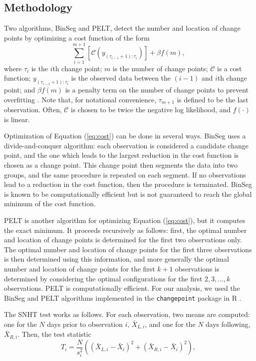 \documentclass[12pt]{article}
\begin{document}
\begin{doublespacing}
\subsection{Methodology}
\label{ssec:methodology}

Two algorithms, BinSeg and PELT, detect the number and location of change points by optimizing a cost function of the form
\begin{equation}
	\sum_{i=1}^{m+1} [\mathcal{C}(y_{(\tau_{i-1}+1):\tau_i})] + \beta f(m),
	\label{eq:cost}
\end{equation}
where $\tau_i$ is the $i$th change point; $m$ is the number of change points; $\mathcal{C}$ is a cost function; $y_{(\tau_{i-1}+1):\tau_i}$ is the observed data between the $(i-1)$ and $i$th change point; and $\beta f(m)$ is a penalty term on the number of change points to prevent overfitting \cite{killick12}.  Note that, for notational convenience, $\tau_{m+1}$ is defined to be the last observation.  Often, $\mathcal{C}$ is chosen to be twice the negative log likelihood, and $f(\cdot)$ is linear.

Optimization of Equation (\ref{eq:cost}) can be done in several ways.  BinSeg uses a divide-and-conquer algorithm: each observation is considered a candidate change point, and the one which leads to the largest reduction in the cost function is chosen as a change point.  This change point then segments the data into two groups, and the same procedure is repeated on each segment.  If no observations lead to a reduction in the cost function, then the procedure is terminated.  BinSeg is known to be computationally efficient but is not guaranteed to reach the global minimum of the cost function.

PELT is another algorithm for optimizing Equation (\ref{eq:cost}), but it computes the exact minimum.  It proceeds recursively as follows: first, the optimal number and location of change points is determined for the first two observations  only.  The optimal number and location of change points for the first three observations is then determined using this information, and more generally the optimal number and location of change points for the first $k+1$ observations is determined by considering the optimal configurations for the first $2, 3, \ldots, k$ observations.  PELT is computationally efficient.  For our analysis, we used the BinSeg and PELT algorithms implemented in the \texttt{changepoint} package in R \cite{killick14}.

The SNHT test works as follows.  For each observation, two means are computed: one for the $N$ days prior to observation $i$, $\bar{X}_{L,i}$, and one for the $N$ days following, $\bar{X}_{R,i}$.  Then, the test statistic
\begin{equation}
	T_i = \frac{N}{s_i^2}\left( (\bar{X}_{L,i}-\bar{X}_i)^2 + (\bar{X}_{R,i}-\bar{X}_i)^2\right),
	\label{eq:Hom}
\end{equation}


\end{doublespacing}
\end{document}
